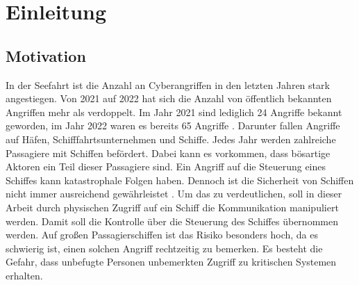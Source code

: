\chapter{Einleitung}

\section{Motivation}
In der Seefahrt ist die Anzahl an Cyberangriffen in den letzten Jahren stark angestiegen. Von 2021 auf 2022 hat sich die Anzahl von öffentlich
bekannten Angriffen mehr als verdoppelt. Im Jahr 2021 sind lediglich 24 Angriffe bekannt geworden, im Jahr 2022 waren es bereits 65 Angriffe 
\cite{mcad}. Darunter fallen Angriffe auf Häfen, Schifffahrtsunternehmen und Schiffe.
Jedes Jahr werden zahlreiche Passagiere mit Schiffen befördert. Dabei kann es vorkommen, dass bösartige Aktoren ein Teil dieser Passagiere sind.
Ein Angriff auf die Steuerung eines Schiffes kann katastrophale Folgen haben. Dennoch ist die Sicherheit von Schiffen nicht 
immer ausreichend gewährleistet \cite{Reilly2016}.
Um das zu verdeutlichen, soll in dieser Arbeit durch physischen Zugriff auf ein Schiff die Kommunikation manipuliert werden.
Damit soll die Kontrolle über die Steuerung des Schiffes übernommen werden. 
Auf großen Passagierschiffen ist das Risiko besonders hoch, da es
schwierig ist, einen solchen Angriff rechtzeitig zu bemerken. Es besteht die Gefahr, 
dass unbefugte Personen unbemerkten Zugriff zu kritischen Systemen erhalten. \\


